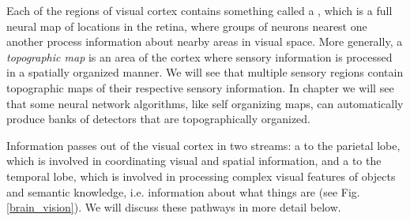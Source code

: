 Each of the regions of visual cortex contains something called a , which is a full neural map of locations in the retina, where groups of neurons nearest one another process information about nearby areas in visual space. More generally, a \emph{topographic map} is an area of the cortex where sensory information is processed in a spatially organized manner. We will see that multiple sensory regions contain topographic maps of their respective sensory information. In chapter  we will see that some neural network algorithms, like self organizing maps, can automatically produce banks of detectors that are topographically organized.

Information passes out of the visual cortex in two streams: a  to the parietal lobe, which is involved in coordinating visual and spatial information, and a  to the temporal lobe, which is involved in processing complex visual features of objects and semantic knowledge, i.e. information about what things are  (see Fig. \ref{brain_vision}). We will discuss these pathways in more detail below.


